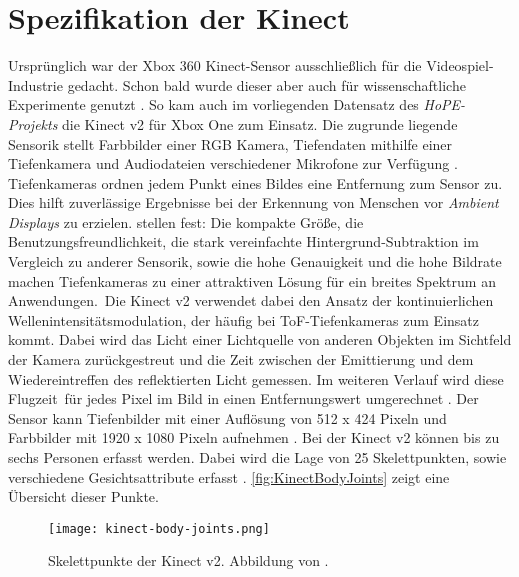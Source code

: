\section{Spezifikation der Kinect}
\label{2-SpezifikationKinect}
Ursprünglich war der Xbox 360 Kinect-Sensor ausschließlich für die Videospiel-Industrie gedacht.
Schon bald wurde dieser aber auch für wissenschaftliche Experimente genutzt \citep{tolgyessy_evaluation_2021}.
So kam auch im vorliegenden Datensatz des \emph{HoPE-Projekts} die Kinect v2 für Xbox One zum Einsatz.
Die zugrunde liegende Sensorik stellt Farbbilder einer \ac{RGB} Kamera, Tiefendaten mithilfe einer Tiefenkamera
und Audiodateien verschiedener Mikrofone zur Verfügung \citep{windows-developer-center_microsoft_corporation_human_2014}.
Tiefenkameras ordnen jedem Punkt eines Bildes eine Entfernung zum Sensor zu.
Dies hilft zuverlässige Ergebnisse bei der Erkennung von Menschen vor \emph{Ambient Displays} zu erzielen.
\citet{li_time-flight_2014} stellen fest:
\glqq Die kompakte Größe, die Benutzungsfreundlichkeit,
die stark vereinfachte Hintergrund-Subtraktion im Vergleich zu anderer Sensorik, sowie die hohe Genauigkeit
und die hohe Bildrate machen Tiefenkameras zu einer attraktiven Lösung für ein breites Spektrum an Anwendungen.\grqq\
Die Kinect v2 verwendet dabei den Ansatz der kontinuierlichen Wellenintensitätsmodulation,
der häufig bei \ac{ToF}-Tiefenkameras zum Einsatz kommt.
Dabei wird das Licht einer Lichtquelle von anderen Objekten im Sichtfeld der Kamera zurückgestreut
und die Zeit zwischen der Emittierung und dem Wiedereintreffen des reflektierten Licht gemessen.
Im weiteren Verlauf wird diese \glqq Flugzeit\grqq\ für jedes Pixel im Bild in einen Entfernungswert umgerechnet \citep{tolgyessy_evaluation_2021}.
Der Sensor kann Tiefenbilder mit einer Auflösung von 512 x 424 Pixeln
und Farbbilder mit 1920 x 1080 Pixeln aufnehmen \citep{marin_multi-camera_2019}.
Bei der Kinect v2 können bis zu sechs Personen erfasst werden.
Dabei wird die Lage von 25 Skelettpunkten, sowie verschiedene Gesichtsattribute erfasst \citep{windows-developer-center_microsoft_corporation_human_2014}.
\autoref{fig:KinectBodyJoints} zeigt eine Übersicht dieser Punkte. 
\begin{figure}[ht]
  \begin{center}
  \texttt{[image: kinect-body-joints.png]}
  \end{center}
  \caption{Skelettpunkte der Kinect v2. Abbildung von \citet{windows-developer-center_microsoft_corporation_human_2014}.}
  \label{fig:KinectBodyJoints}
\end{figure}

